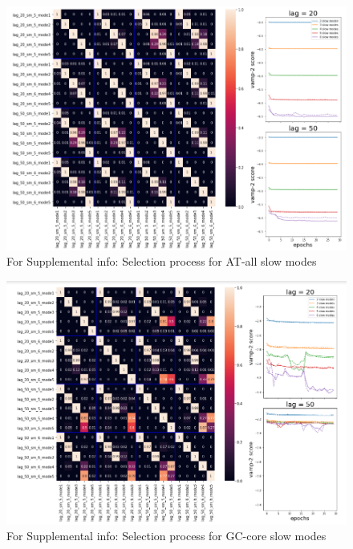 \documentclass[journal=jpcbfk,manuscript=article]{achemso}
\begin{document}
\begin{figure}[ht!]
	\begin{center}
        \includegraphics[width=\textwidth]{Figs/skeleton/AT-all_validation.PNG}
        \caption{For Supplemental info: Selection process for AT-all slow modes}
        \label{fig:AT-all_val}
	\end{center}
\end{figure}

\begin{figure}[ht!]
	\begin{center}
        \includegraphics[width=\textwidth]{Figs/skeleton/GC-core_validation.PNG}
        \caption{For Supplemental info: Selection process for GC-core slow modes}
        \label{fig:GC-core_val}
	\end{center}
\end{figure}
\end{document}
